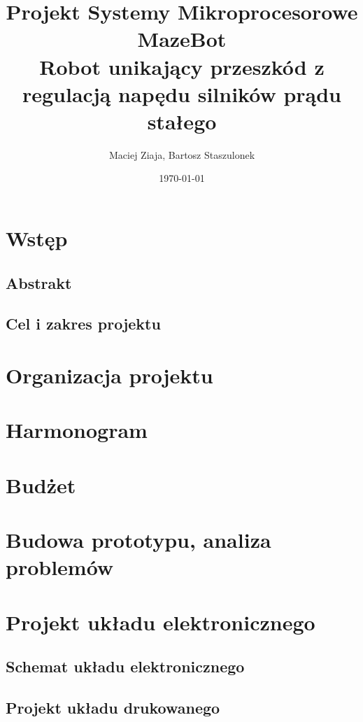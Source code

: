 \documentclass{article}
\author{Maciej Ziaja, Bartosz Staszulonek}
\date{\today}
\begin{document}
\title{
  Projekt Systemy Mikroprocesorowe \\
  \large MazeBot \\
    Robot unikający przeszkód z regulacją napędu silników prądu stałego}

\maketitle
\tableofcontents
\newpage

\section{Wstęp}
\subsection{Abstrakt}
\subsection{Cel i zakres projektu}

\section{Organizacja projektu}
\section{Harmonogram}
\section{Budżet}

\section{Budowa prototypu, analiza problemów}

\section{Projekt układu elektronicznego}
\subsection{Schemat układu elektronicznego}
\subsection{Projekt układu drukowanego}
\end{document}
